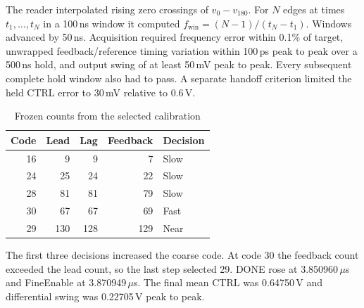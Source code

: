 \documentclass[10pt,conference,letterpaper]{IEEEtran}
\begin{document}
The reader interpolated rising zero crossings of $v_0-v_{180}$. For $N$ edges at times $t_1,\ldots,t_N$ in a 100\,ns window it computed $f_{\mathrm{win}}=(N-1)/(t_N-t_1)$. Windows advanced by 50\,ns. Acquisition required frequency error within 0.1\% of target, unwrapped feedback/reference timing variation within 100\,ps peak to peak over a 500\,ns hold, and output swing of at least 50\,mV peak to peak. Every subsequent complete hold window also had to pass. A separate handoff criterion limited the held CTRL error to 30\,mV relative to 0.6\,V.
\begin{table}[!t]\centering\caption{Frozen counts from the selected calibration}\label{tab:codes}
\begin{tabular}{rrrrl}\toprule
Code & Lead & Lag & Feedback & Decision\\\midrule
16&9&9&7&Slow\\24&25&24&22&Slow\\28&81&81&79&Slow\\30&67&67&69&Fast\\29&130&128&129&Near\\\bottomrule
\end{tabular}\end{table}
The first three decisions increased the coarse code. At code 30 the feedback count exceeded the lead count, so the last step selected 29. DONE rose at 3.850960\,$\mu$s and FineEnable at 3.870949\,$\mu$s. The final mean CTRL was 0.64750\,V and differential swing was 0.22705\,V peak to peak.
\end{document}
